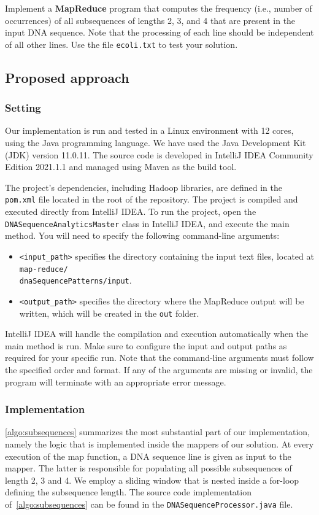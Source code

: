 \documentclass[acmlarge]{acmart}
\begin{document}
Implement a \textbf{MapReduce} program that computes the frequency (i.e., number of occurrences) of all subsequences of lengths 2, 3, and 4 that are present in the input DNA sequence. Note that the processing of each line should be independent of all other lines. Use the file \texttt{ecoli.txt} to test your solution.

\subsection{Proposed approach}
\subsubsection{Setting}
Our implementation is run and tested in a Linux environment with 12 cores, using the Java programming language.
We have used the Java Development Kit (JDK) version 11.0.11.
The source code is developed in IntelliJ IDEA Community Edition 2021.1.1 and managed using Maven as the build tool.

The project’s dependencies, including Hadoop libraries, are defined in the \texttt{pom.xml} file located in the root of
the repository.
The project is compiled and executed directly from IntelliJ IDEA.
To run the project, open the \texttt{DNASequenceAnalyticsMaster} class in IntelliJ IDEA, and execute the main method.
You will need to specify the following command-line arguments:

\begin{itemize}
  \item \texttt{<input\_path>} specifies the directory containing the input text files, located at \texttt{map-reduce/ \\ dnaSequencePatterns/input}.
  \item \texttt{<output\_path>} specifies the directory where the MapReduce output will be written, which will be created in the \texttt{out} folder.
\end{itemize}

IntelliJ IDEA will handle the compilation and execution automatically when the main method is run. Make sure to configure the input and output paths as required for your specific run. Note that the command-line arguments must follow the specified order and format. If any of the arguments are missing or invalid, the program will terminate with an appropriate error message.

\subsubsection{Implementation} \autoref{algo:subsequences} summarizes the most substantial part of our implementation, namely the logic that is implemented inside the mappers of our solution. At every execution of the map function, a DNA sequence line is given as input to the mapper. The latter is responsible for populating all possible subsequences of length 2, 3 and 4. We employ a sliding window that is nested inside a for-loop defining the subsequence length. The source code implementation of~\autoref{algo:subsequences} can be found in the \texttt{DNASequenceProcessor.java} file.
\end{document}
